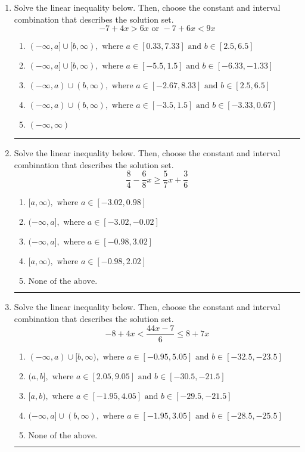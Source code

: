 \documentclass[14pt]{extbook}
\newcommand{\litem}[1]{\item#1\hspace*{-1cm}\rule{\textwidth}{0.4pt}}
\begin{document}
\begin{enumerate}
{\begin{enumerate}[label=\Alph*.]
\end{enumerate} }
\litem{
Solve the linear inequality below. Then, choose the constant and interval combination that describes the solution set.\[ -7 + 4 x > 6 x \text{ or } -7 + 6 x < 9 x \]\begin{enumerate}[label=\Alph*.]
\item \( (-\infty, a] \cup [b, \infty), \text{ where } a \in [0.33, 7.33] \text{ and } b \in [2.5, 6.5] \)
\item \( (-\infty, a] \cup [b, \infty), \text{ where } a \in [-5.5, 1.5] \text{ and } b \in [-6.33, -1.33] \)
\item \( (-\infty, a) \cup (b, \infty), \text{ where } a \in [-2.67, 8.33] \text{ and } b \in [2.5, 6.5] \)
\item \( (-\infty, a) \cup (b, \infty), \text{ where } a \in [-3.5, 1.5] \text{ and } b \in [-3.33, 0.67] \)
\item \( (-\infty, \infty) \)

\end{enumerate} }
\litem{
Solve the linear inequality below. Then, choose the constant and interval combination that describes the solution set.\[ \frac{8}{4} - \frac{6}{8} x \geq \frac{5}{7} x + \frac{3}{6} \]\begin{enumerate}[label=\Alph*.]
\item \( [a, \infty), \text{ where } a \in [-3.02, 0.98] \)
\item \( (-\infty, a], \text{ where } a \in [-3.02, -0.02] \)
\item \( (-\infty, a], \text{ where } a \in [-0.98, 3.02] \)
\item \( [a, \infty), \text{ where } a \in [-0.98, 2.02] \)
\item \( \text{None of the above}. \)

\end{enumerate} }
\litem{
Solve the linear inequality below. Then, choose the constant and interval combination that describes the solution set.\[ -8 + 4 x < \frac{44 x - 7}{6} \leq 8 + 7 x \]\begin{enumerate}[label=\Alph*.]
\item \( (-\infty, a) \cup [b, \infty), \text{ where } a \in [-0.95, 5.05] \text{ and } b \in [-32.5, -23.5] \)
\item \( (a, b], \text{ where } a \in [2.05, 9.05] \text{ and } b \in [-30.5, -21.5] \)
\item \( [a, b), \text{ where } a \in [-1.95, 4.05] \text{ and } b \in [-29.5, -21.5] \)
\item \( (-\infty, a] \cup (b, \infty), \text{ where } a \in [-1.95, 3.05] \text{ and } b \in [-28.5, -25.5] \)
\item \( \text{None of the above.} \)


\end{enumerate}}
\end{enumerate}
\end{document}
